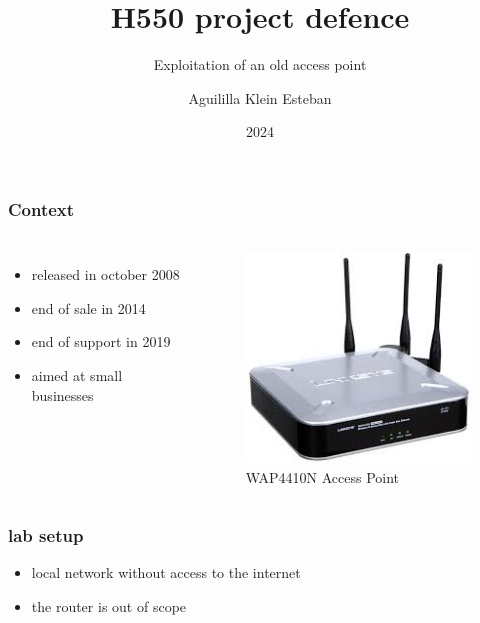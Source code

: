 \documentclass{beamer}
\title{H550 project defence}
\subtitle{Exploitation of an old access point}
\author{Aguililla Klein Esteban}
\institute{ULB}
\date{2024}
\begin{document}
\frame{\titlepage}

\begin{frame}
	\frametitle{Context}
	\begin{columns}
		\begin{itemize}
			\item released in october 2008
			\item end of sale in 2014
			\item end of support in 2019
			\item aimed at small businesses
		\end{itemize}
		\begin{figure}
			\centering	
			\includegraphics[width=\linewidth]{AP.jpg}
			\caption{WAP4410N Access Point}
		\end{figure}
	\end{columns}
\end{frame}
\begin{frame}
	\frametitle{lab setup}	
	\begin{figure}
		\centering	
		\scalebox{0.6}{
		
		}
	\end{figure}
	\begin{itemize}
		\item local network without access to the internet
		\item the router is out of scope
	\end{itemize}
\end{frame}
\end{document}
